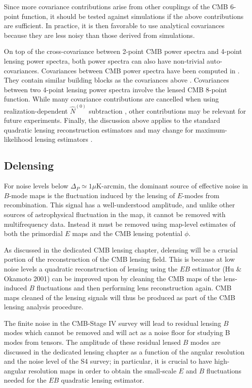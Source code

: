  Since more covariance contributions arise from other couplings of the CMB 6-point function, it should be tested against simulations if the above contributions are sufficient.  In practice, it is then favorable to use analytical covariances because they are less noisy than those derived from simulations.   
 
On top of the cross-covariance between 2-point CMB power spectra and 4-point lensing power spectra, both power spectra can also have non-trivial auto-covariances.  Covariances between CMB power spectra have been computed in \cite{2006PhRvD..74l3002S,2007PhRvD..75h3501L,BenoitSmithHu1205}. They contain similar building blocks as the covariances above \cite{BenoitSmithHu1205}.  Covariances between two 4-point lensing power spectra involve the lensed CMB 8-point function.  While many covariance contributions are cancelled when using realization-dependent $\hat N^{(0)}$ subtraction \cite{duncan1008}, other contributions may be relevant for future experiments.  Finally, the discussion above applies to the standard quadratic lensing reconstruction estimators and may change for maximum-likelihood lensing estimators \cite{HirataSeljak0209489}.

\subsection{Delensing}
For noise levels below $\Delta_P \simeq 1 \mu$K-arcmin,  the dominant source of effective noise in $B$-mode maps is the fluctuation induced by the lensing of $E$-modes from recombination.  This signal has a well-understood amplitude, and unlike other sources of astrophysical fluctuation in the map, it cannot be removed with multifrequency data.  Instead it must be removed using map-level estimates of both the primordial $E$ maps and the CMB lensing potential $\phi$.  

As discussed in the dedicated CMB lensing chapter, delensing will be a crucial portion of the reconstruction of the CMB lensing field.  This is because at low noise levels a quadratic reconstruction of lensing using the $EB$ estimator (Hu $\&$ Okamoto 2001) can be improved upon by cleaning the CMB maps of the lens-induced $B$ fluctuations and then performing lens reconstruction again.   CMB maps cleaned of the lensing signals will thus be produced as part of the CMB lensing analysis procedure.

The finite noise in the CMB-Stage IV survey will lead to residual lensing $B$ modes which cannot be removed and will act as a noise floor for studying B modes from tensors.  The amplitude of these residual lensed $B$ modes are discussed in the dedicated lensing chapter as a function of the angular resolution and the noise level of the S4 survey; in particular, it is crucial to have high-angular resolution maps in order to obtain the small-scale $E$ and $B$ fluctuations needed for the $EB$ quadratic lensing estimator.

